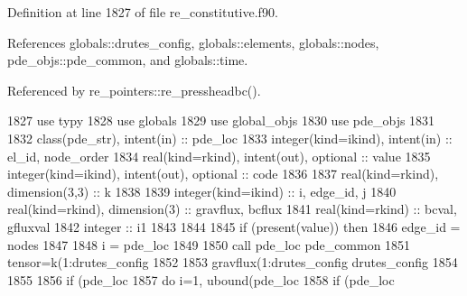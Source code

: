 Definition at line 1827 of file re\+\_\+constitutive.\+f90.



References globals\+::drutes\+\_\+config, globals\+::elements, globals\+::nodes, pde\+\_\+objs\+::pde\+\_\+common, and globals\+::time.



Referenced by re\+\_\+pointers\+::re\+\_\+pressheadbc().


\begin{DoxyCode}
1827         \textcolor{keywordtype}{use }typy
1828         \textcolor{keywordtype}{use }globals
1829         \textcolor{keywordtype}{use }global_objs
1830         \textcolor{keywordtype}{use }pde_objs
1831 
1832         \textcolor{keywordtype}{class}(pde_str), \textcolor{keywordtype}{intent(in)} :: pde\_loc
1833         \textcolor{keywordtype}{integer(kind=ikind)}, \textcolor{keywordtype}{intent(in)}  :: el\_id, node\_order
1834         \textcolor{keywordtype}{real(kind=rkind)}, \textcolor{keywordtype}{intent(out)}, \textcolor{keywordtype}{optional}    :: value
1835         \textcolor{keywordtype}{integer(kind=ikind)}, \textcolor{keywordtype}{intent(out)}, \textcolor{keywordtype}{optional} :: code
1836         
1837         \textcolor{keywordtype}{real(kind=rkind)}, \textcolor{keywordtype}{dimension(3,3)} :: k
1838 
1839         \textcolor{keywordtype}{integer(kind=ikind)} :: i, edge\_id, j
1840         \textcolor{keywordtype}{real(kind=rkind)}, \textcolor{keywordtype}{dimension(3)} :: gravflux, bcflux
1841         \textcolor{keywordtype}{real(kind=rkind)} :: bcval, gfluxval
1842         \textcolor{keywordtype}{integer} :: i1
1843 
1844       
1845         \textcolor{keywordflow}{if} (\textcolor{keyword}{present}(\textcolor{keywordtype}{value})) \textcolor{keywordflow}{then}
1846           edge\_id = nodes%
1847 
1848           i = pde\_loc%
1849 
1850           \textcolor{keyword}{call }pde\_loc%
      pde_common%
1851                               tensor=k(1:drutes_config%
1852 
1853           gravflux(1:drutes_config%
      drutes_config%
1854           
1855 
1856           \textcolor{keywordflow}{if} (pde\_loc%
1857             \textcolor{keywordflow}{do} i=1, ubound(pde\_loc%
1858               \textcolor{keywordflow}{if} (pde\_loc%

\end{DoxyCode}
